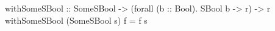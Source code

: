 \begin{code}
withSomeSBool
    :: SomeSBool
    -> (forall (b :: Bool). SBool b -> r)
    -> r
withSomeSBool (SomeSBool s) f = f s
\end{code}

